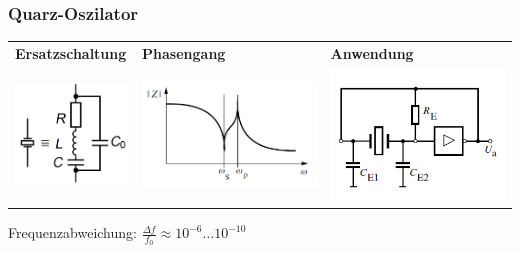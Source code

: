 	\subsubsection{Quarz-Oszilator}
		\begin{tabular}{lll}
			\textbf{Ersatzschaltung} & \textbf{Phasengang} & \textbf{Anwendung} \\
			\begin{minipage}{6cm}
				\includegraphics[width=3cm]{images/osziCrystal.png}
			\end{minipage} &
			\begin{minipage}{6cm}
				\includegraphics[width=5cm]{images/quarz-kennl.png}
			\end{minipage} & 
			\begin{minipage}{6cm}
					\includegraphics[width=5cm]{images/quarz-schaltung.png}
			\end{minipage}	\\
		\end{tabular}	
			
		Frequenzabweichung: $\frac{\Delta f}{f_0} \approx 10^{-6} \dots 10^{-10}$ \\
		
